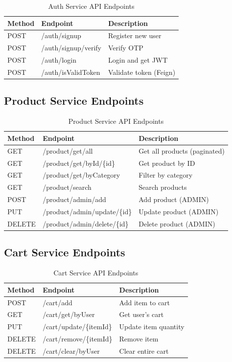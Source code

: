 \begin{table}[h!]
\centering
\caption{Auth Service API Endpoints}
\begin{tabular}{|l|l|l|}
\hline
\textbf{Method} & \textbf{Endpoint} & \textbf{Description} \\
\hline
POST & /auth/signup & Register new user \\
POST & /auth/signup/verify & Verify OTP \\
POST & /auth/login & Login and get JWT \\
POST & /auth/isValidToken & Validate token (Feign) \\
\hline
\end{tabular}
\end{table}

\subsection{Product Service Endpoints}

\begin{table}[h!]
\centering
\caption{Product Service API Endpoints}
\begin{tabular}{|l|l|l|}
\hline
\textbf{Method} & \textbf{Endpoint} & \textbf{Description} \\
\hline
GET & /product/get/all & Get all products (paginated) \\
GET & /product/get/byId/\{id\} & Get product by ID \\
GET & /product/get/byCategory & Filter by category \\
GET & /product/search & Search products \\
POST & /product/admin/add & Add product (ADMIN) \\
PUT & /product/admin/update/\{id\} & Update product (ADMIN) \\
DELETE & /product/admin/delete/\{id\} & Delete product (ADMIN) \\
\hline
\end{tabular}
\end{table}

\subsection{Cart Service Endpoints}

\begin{table}[h!]
\centering
\caption{Cart Service API Endpoints}
\begin{tabular}{|l|l|l|}
\hline
\textbf{Method} & \textbf{Endpoint} & \textbf{Description} \\
\hline
POST & /cart/add & Add item to cart \\
GET & /cart/get/byUser & Get user's cart \\
PUT & /cart/update/\{itemId\} & Update item quantity \\
DELETE & /cart/remove/\{itemId\} & Remove item \\
DELETE & /cart/clear/byUser & Clear entire cart \\
\hline
\end{tabular}
\end{table}

